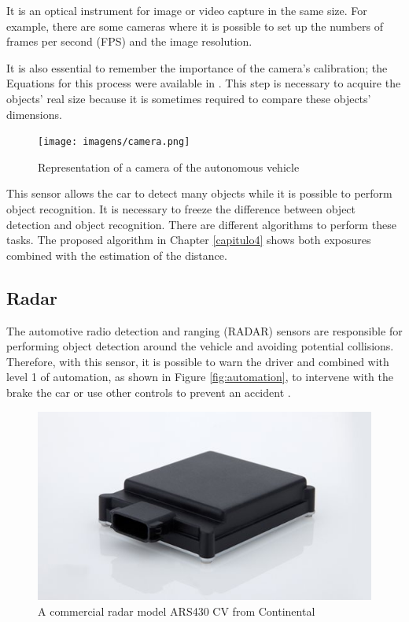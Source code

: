 It is an optical instrument for image or video capture in the same size. For example, there are some cameras where it is possible to set up the numbers of frames per second (FPS) and the image resolution. 

It is also essential to remember the importance of the camera's calibration; the Equations for this process were available in \cite{888718}. This step is necessary to acquire the objects' real size because it is sometimes required to compare these objects' dimensions. 

\begin{figure}[H]
\centering
\texttt{[image: imagens/camera.png]}
\caption{Representation of a camera of the autonomous vehicle}
\label{fig:camera}
\end{figure}

This sensor allows the car to detect many objects while it is possible to perform object recognition. It is necessary to freeze the difference between object detection and object recognition. There are different algorithms to perform these tasks. The proposed algorithm in Chapter \ref{capitulo4} shows both exposures combined with the estimation of the distance. 

\subsection{Radar}

The automotive radio detection and ranging (RADAR) sensors are responsible for performing object detection around the vehicle and avoiding potential collisions. Therefore, with this sensor, it is possible to warn the driver and combined with level 1 of automation, as shown in Figure \ref{fig:automation}, to intervene with the brake the car or use other controls to prevent an accident \cite{ariyur2006collision}.

\begin{figure}[H]
\centering
\includegraphics[width=\columnwidth]{imagens/radar.jpg}
\caption{A commercial radar model ARS430 CV from Continental}
\label{fig:camera}
\end{figure}

